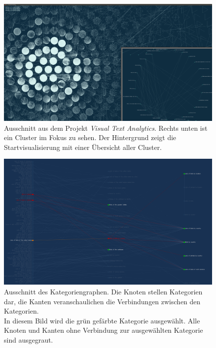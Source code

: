 \begin{figure}
\centering
\includegraphics[width=\textwidth]{images/01_introduction/vta-cover.png}
\caption{Ausschnitt aus dem Projekt \textit{Visual Text Analytics}. Rechts unten ist ein Cluster im Fokus zu sehen. Der Hintergrund zeigt die Startvisualisierung mit einer Übersicht aller Cluster.}
\label{fig:vta-cover}
\end{figure}

\begin{figure}
    \centering
    \includegraphics[width=\textwidth]{images/01_introduction/category-view.png}
    \caption{Ausschnitt des Kategoriengraphen. Die Knoten stellen Kategorien dar, die Kanten veranschaulichen die Verbindungen zwischen den Kategorien.\\ In diesem Bild wird die grün gefärbte Kategorie ausgewählt. Alle Knoten und Kanten ohne Verbindung zur ausgewählten Kategorie sind ausgegraut.}
    \label{fig:category-view}
\end{figure}
















